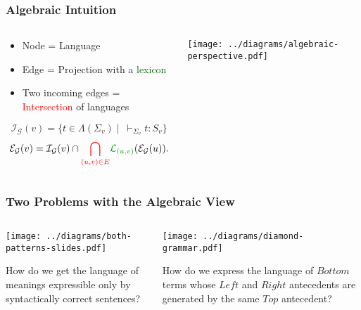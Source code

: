 \documentclass{beamer}
\begin{document}
\begin{frame}
  \frametitle{Algebraic Intuition}

  \begin{columns}[c]
    \begin{column}{0.7\textwidth}
      \begin{block}{}
        \begin{itemize}
        \item Node = Language
        \item Edge = Projection with a \textcolor{darkgreen}{lexicon}
        \item Two incoming edges = \textcolor{red}{Intersection} of languages
        \end{itemize}
      \end{block}

$$
\mathcal{I}_{\mathcal{G}}(v) = \{t \in \Lambda(\Sigma_v)
\mid\ \vdash_{\Sigma_v} t : S_v\}
$$
$$
\mathcal{E}_{\mathcal{G}}(v) = \mathcal{I}_{\mathcal{G}}(v) \cap
\textcolor{red}{\bigcap_{(u,v) \in E}}
\textcolor{darkgreen}{\mathcal{L}_{(u,v)}}(\mathcal{E}_{\mathcal{G}}(u)).
$$
    \end{column}
    \begin{column}{0.3\textwidth}
      \texttt{[image: ../diagrams/algebraic-perspective.pdf]}
    \end{column}
  \end{columns}

\end{frame}


\begin{frame}
  \frametitle{Two Problems with the Algebraic View}

  \begin{columns}[t]
    \begin{column}{0.5\textwidth}
      \begin{center}
        \texttt{[image: ../diagrams/both-patterns-slides.pdf]}
      \end{center}

      How do we get the language of meanings expressible only by
      syntactically correct sentences?
    \end{column}
    \begin{column}{0.5\textwidth}
      \begin{center}
        \texttt{[image: ../diagrams/diamond-grammar.pdf]}
      \end{center}

      How do we express the language of $Bottom$ terms whose $Left$ and
      $Right$ antecedents are generated by the same $Top$ antecedent?
    \end{column}
  \end{columns}
\end{frame}
\end{document}
